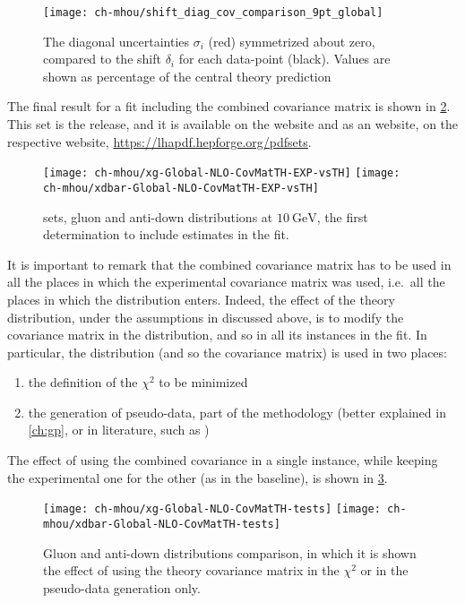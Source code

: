 \begin{figure}
	\centering
	\texttt{[image: ch-mhou/shift\_diag\_cov\_comparison\_9pt\_global]}
	\caption{
		The diagonal uncertainties $\sigma_i$ (red) symmetrized about zero,
		compared to the shift $\delta_i$ for each data-point (black).
		Values are shown as percentage of the central theory prediction
	}
	\label{fig:mhou/scvar-shifts}
\end{figure}

The final result for a fit including the combined covariance matrix is shown in
\cref{fig:mhou/3.1th}.
%
This set is the  release, and it is available on the
\nnpdf website and as an \lhapdf website, on the respective website,
\url{https://lhapdf.hepforge.org/pdfsets}.

\begin{figure}
	\centering
	\texttt{[image: ch-mhou/xg-Global-NLO-CovMatTH-EXP-vsTH]}
	\texttt{[image: ch-mhou/xdbar-Global-NLO-CovMatTH-EXP-vsTH]}
	\caption{
		 \nlo sets, gluon and anti-down distributions at
		$\SI{10}{\giga\electronvolt}$, the first \pdf determination to include
		\mhou estimates in the fit.
	}
	\label{fig:mhou/3.1th}
\end{figure}

It is important to remark that the combined covariance matrix has to be used in
all the places in which the experimental covariance matrix was used, i.e.\ all
the places in which the distribution enters.
%
Indeed, the effect of the theory distribution, under the assumptions in
\cite{NNPDF:2019ubu} discussed above, is to modify the covariance matrix in the
distribution, and so in all its instances in the \pdf fit.
%
In particular, the distribution (and so the covariance matrix) is used in two
places:
\begin{enumerate}[label=\roman*.]
  \item the definition of the $\chi^2$ to be minimized
  \item the generation of pseudo-data, part of the \nnpdf methodology (better
    explained in \cref{ch:gp}, or in \nnpdf literature, such as
    \cite{Ball:2008by})
\end{enumerate}
%
The effect of using the combined covariance in a single instance, while keeping
the experimental one for the other (as in the baseline), is shown in
\cref{fig:mhou/3.1th-tests}.

\begin{figure}
	\centering
	\texttt{[image: ch-mhou/xg-Global-NLO-CovMatTH-tests]}
	\texttt{[image: ch-mhou/xdbar-Global-NLO-CovMatTH-tests]}
	\caption{
		Gluon and anti-down distributions comparison, in which it is shown the
		effect of using the theory covariance matrix in the $\chi^2$ or in the
		pseudo-data generation only.
	}
	\label{fig:mhou/3.1th-tests}
\end{figure}

